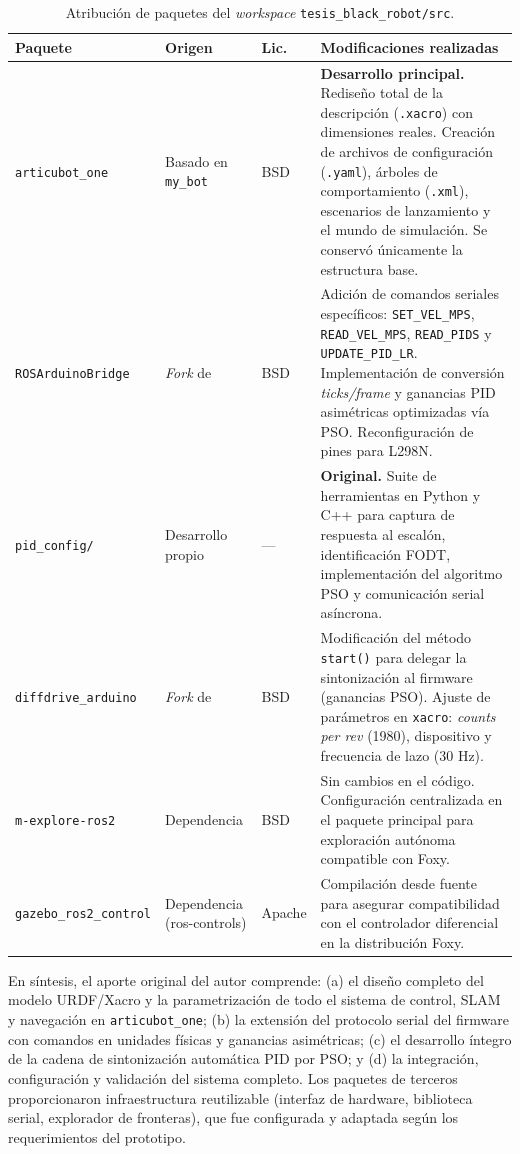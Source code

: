 \begin{table}[H]
\centering
\caption{Atribución de paquetes del \textit{workspace} \texttt{tesis\_black\_robot/src}.}
\label{tab:atribucion}
\footnotesize
\begin{tabular}{P{2.5cm} P{2.2cm} P{1.2cm} P{7.0cm}}
    \toprule
    \textbf{Paquete} & \textbf{Origen} & \textbf{Lic.} & \textbf{Modificaciones realizadas} \\ 
    \midrule
    \texttt{articubot\_one} & Basado en \texttt{my\_bot} \cite{NewansMyBot} & BSD & \textbf{Desarrollo principal.} Rediseño total de la descripción (\texttt{.xacro}) con dimensiones reales. Creación de archivos de configuración (\texttt{.yaml}), árboles de comportamiento (\texttt{.xml}), escenarios de lanzamiento y el mundo de simulación. Se conservó únicamente la estructura base. \\
    \midrule
    \texttt{ROSArduinoBridge} & \textit{Fork} de \cite{ROSArduinoBridge} & BSD & Adición de comandos seriales específicos: \texttt{SET\_VEL\_MPS}, \texttt{READ\_VEL\_MPS}, \texttt{READ\_PIDS} y \texttt{UPDATE\_PID\_LR}. Implementación de conversión \textit{ticks/frame} y ganancias PID asimétricas optimizadas vía PSO. Reconfiguración de pines para L298N. \\
    \midrule
    \texttt{pid\_config/} & Desarrollo propio & --- & \textbf{Original.} Suite de herramientas en Python y C++ para captura de respuesta al escalón, identificación FODT, implementación del algoritmo PSO y comunicación serial asíncrona. \\
    \midrule
    \texttt{diffdrive\_arduino} & \textit{Fork} de \cite{NewansDiffDrive} & BSD & Modificación del método \texttt{start()} para delegar la sintonización al firmware (ganancias PSO). Ajuste de parámetros en \texttt{xacro}: \textit{counts per rev} (1980), dispositivo y frecuencia de lazo (30 Hz). \\
    \midrule
    \texttt{m-explore-ros2} & Dependencia \cite{MExploreROS2} & BSD & Sin cambios en el código. Configuración centralizada en el paquete principal para exploración autónoma compatible con Foxy. \\
    \midrule
    \texttt{gazebo\_ros2\_control} & Dependencia (ros-controls) & Apache & Compilación desde fuente para asegurar compatibilidad con el controlador diferencial en la distribución Foxy. \\
    \bottomrule
\end{tabular}
\end{table}
 
\noindent
En síntesis, el aporte original del autor comprende: (a) el diseño completo del modelo URDF/Xacro y la parametrización de todo el sistema de control, SLAM y navegación en \texttt{articubot\_one}; (b) la extensión del protocolo serial del firmware con comandos en unidades físicas y ganancias asimétricas; (c) el desarrollo íntegro de la cadena de sintonización automática PID por PSO; y (d) la integración, configuración y validación del sistema completo. Los paquetes de terceros proporcionaron infraestructura reutilizable (interfaz de hardware, biblioteca serial, explorador de fronteras), que fue configurada y adaptada según los requerimientos del prototipo.

